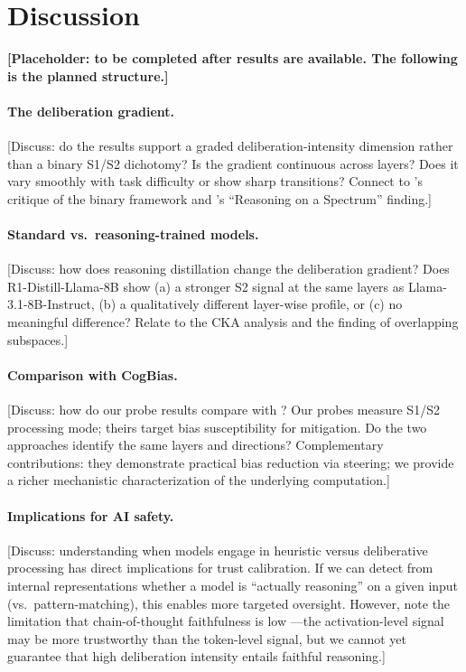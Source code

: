 
\section{Discussion}
\label{sec:discussion}

\textbf{[Placeholder: to be completed after results are available.  The
following is the planned structure.]}

\paragraph{The deliberation gradient.}
[Discuss: do the results support a graded deliberation-intensity dimension
rather than a binary S1/S2 dichotomy?  Is the gradient continuous across
layers?  Does it vary smoothly with task difficulty or show sharp transitions?
Connect to \citet{melnikoff2018mythical}'s critique of the binary framework
and \citet{ziabari2025reasoning}'s ``Reasoning on a Spectrum'' finding.]

\paragraph{Standard vs.\ reasoning-trained models.}
[Discuss: how does reasoning distillation change the deliberation gradient?
Does R1-Distill-Llama-8B show (a) a stronger S2 signal at the same layers as
Llama-3.1-8B-Instruct, (b) a qualitatively different layer-wise profile, or
(c) no meaningful difference?  Relate to the CKA analysis and the
\citet{codaforno2025dual} finding of overlapping subspaces.]

\paragraph{Comparison with CogBias.}
[Discuss: how do our probe results compare with \citet{huang2026cogbias}?
Our probes measure S1/S2 processing mode; theirs target bias susceptibility for
mitigation.  Do the two approaches identify the same layers and directions?
Complementary contributions: they demonstrate practical bias reduction via
steering; we provide a richer mechanistic characterization of the underlying
computation.]

\paragraph{Implications for AI safety.}
[Discuss: understanding when models engage in heuristic versus deliberative
processing has direct implications for trust calibration.  If we can detect
from internal representations whether a model is ``actually reasoning'' on a
given input (vs.\ pattern-matching), this enables more targeted oversight.
However, note the limitation that chain-of-thought faithfulness is low
\citep{jiang2025aha}---the activation-level signal may be more trustworthy than
the token-level signal, but we cannot yet guarantee that high deliberation
intensity entails faithful reasoning.]

